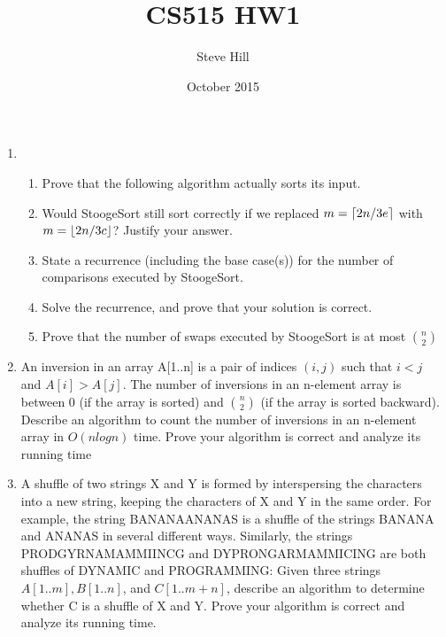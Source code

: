 \documentclass{article}
\title{CS515 HW1}
\author{Steve Hill}
\date{October 2015}
\DeclarePairedDelimiter{\ceil}{\lceil}{\rceil}
\DeclarePairedDelimiter{\floor}{\lfloor}{\rfloor}
\begin{document}
\maketitle

\begin{enumerate}
\item 
    \begin{enumerate}
    \item 
    Prove that the following algorithm actually sorts its input.

    \item
    Would StoogeSort still sort correctly if we replaced $m = \ceil{2n/3e}$ with $m = \floor{2n/3c}$? Justify
your answer.
 
    \item
    State a recurrence (including the base case(s)) for the number of comparisons executed by
StoogeSort.

    \item 
    Solve the recurrence, and prove that your solution is correct. 

    \item
    Prove that the number of swaps executed by StoogeSort is at most $n \choose 2$

    \end{enumerate}

\item 
An inversion in an array A[1..n] is a pair of indices $(i, j)$ such that $i < j$ and
$A[i] > A[j]$. The number of inversions in an n-element array is between 0 (if the array is sorted)
and $n \choose 2$ (if the array is sorted backward). Describe an algorithm to count the number of inversions
in an n-element array in $O(n log n)$ time. Prove your algorithm is correct and analyze its running
time


\item 
A shuffle of two strings X and Y is formed by interspersing the characters into a new string,
keeping the characters of X and Y in the same order. For example, the string BANANAANANAS
is a shuffle of the strings BANANA and ANANAS in several different ways.
Similarly, the strings PRODGYRNAMAMMIINCG and DYPRONGARMAMMICING are both
shuffles of DYNAMIC and PROGRAMMING:
Given three strings $A[1..m], B[1..n]$, and $C[1..m + n]$, describe an algorithm to determine
whether C is a shuffle of X and Y. Prove your algorithm is correct and analyze its running time.


\end{enumerate}
\end{document}
